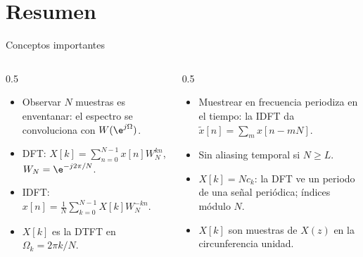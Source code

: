 \documentclass[aspectratio=169,11pt]{beamer}
\begin{document}
\section*{Resumen}
\begin{frame}{Conceptos importantes}
  \begin{columns}[T]
    \begin{column}{0.5\textwidth}
      \begin{itemize}
        \item Observar $N$ muestras es enventanar: el espectro se convoluciona con $W(\e^{j\Omega})$.
        \item DFT: $X[k]=\sum_{n=0}^{N-1}x[n]W_N^{kn}$, $W_N=\e^{-j2\pi/N}$.
        \item IDFT: $x[n]=\frac1N\sum_{k=0}^{N-1}X[k]W_N^{-kn}$.
        \item $X[k]$ es la DTFT en $\Omega_k=2\pi k/N$.
      \end{itemize}
    \end{column}
    \begin{column}{0.5\textwidth}
      \begin{itemize}
        \item Muestrear en frecuencia periodiza en el tiempo: la IDFT da $\tilde x[n]=\sum_mx[n-mN]$.
        \item Sin aliasing temporal si $N\ge L$.
        \item $X[k]=Nc_k$: la DFT ve un periodo de una señal periódica; índices módulo $N$.
        \item $X[k]$ son muestras de $X(z)$ en la circunferencia unidad.
      \end{itemize}
    \end{column}
  \end{columns}
  \bigskip
\end{frame}
\end{document}
